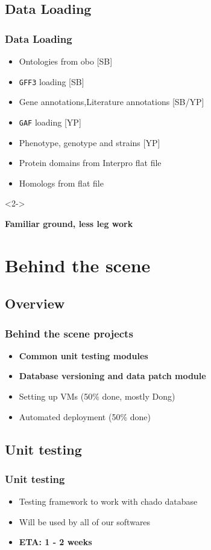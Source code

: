 \documentclass[hyperref={pdfpagelabels=false}, compress]{beamer}
\begin{document}
\subsection{Data Loading}
\begin{frame}
  	\frametitle{Data Loading}
  	\begin{itemize}
		\item Ontologies from obo [SB]
       	\item \texttt{GFF3} loading [SB]
       	\item Gene annotations,Literature annotations [SB/YP]
       	\item \texttt{GAF} loading [YP]
       	\item Phenotype, genotype and strains [YP]
       	\item {\color{dark-gray} Protein domains from Interpro flat file}
       	\item {\color{dark-gray} Homologs from flat file}
  	\end{itemize}
  	
	\begin{block}{}<2->
  		\begin{center}
  			\textbf{\Large Familiar ground, less leg work}
		\end{center}
	\end{block}
	
\end{frame}


\section{Behind the scene}
\subsection{Overview}
\begin{frame}
  \frametitle{Behind the scene projects}
  \begin{itemize}
       \item  \textbf{Common unit testing modules}
        \item \textbf{Database versioning and data patch module}
         \item Setting up VMs (50\% done, mostly Dong)
         \item Automated deployment (50\% done)
  \end{itemize}
\end{frame}

\subsection{Unit testing}
\begin{frame}
  \frametitle{Unit testing}
  \begin{itemize}
      \item Testing framework to work with chado database
      \item Will be used by all of our softwares
      \item \textbf{ETA: 1 - 2 weeks}
  \end{itemize}
\end{frame}
\end{document}
